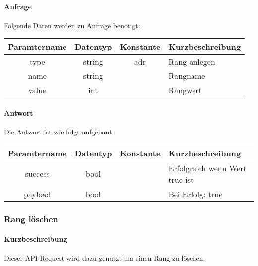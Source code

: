 \paragraph{Anfrage}Folgende Daten werden zu Anfrage benötigt:
\begin{table}[H]
	\begin{tabular}{|c|c|c|p{6.5cm}|}
		\hline
		\textbf{Paramtername} & \textbf{Datentyp} & \textbf{Konstante} & \textbf{Kurzbeschreibung}                                                                                               \\ \hline
		type                & string            & adr                & Rang anlegen \\ \hline
		name                & string            &                    & Rangname \\ \hline
		value               & int               &                    & Rangwert \\ \hline
	\end{tabular}
\end{table}
\paragraph{Antwort}Die Antwort ist wie folgt aufgebaut:
\begin{table}[H]
	\begin{tabular}{|c|c|c|p{6.5cm}|}
		\hline
		\textbf{Paramtername} & \textbf{Datentyp} & \textbf{Konstante} & \textbf{Kurzbeschreibung}            \\ \hline                
		success             & bool             &                 & Erfolgreich wenn Wert {\glqq true\grqq} ist \\ \hline
		payload             & bool             &                 & Bei Erfolg: {\glqq true\grqq} \\ \hline
	\end{tabular}
\end{table}
\subsubsection{Rang löschen}
\paragraph{Kurzbeschreibung}Dieser API-Request wird dazu genutzt um einen Rang zu löschen.
